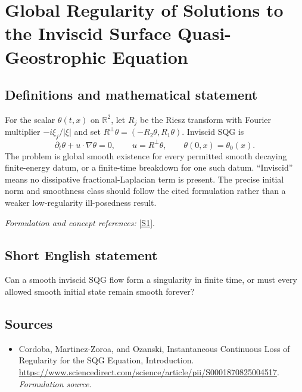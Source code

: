 \documentclass[11pt]{article}
\begin{document}
\section*{\texorpdfstring{Global Regularity of Solutions to the Inviscid Surface Quasi-Geostrophic Equation}{Global Regularity of Solutions to the Inviscid Surface Quasi-Geostrophic Equation}}\label{statement}
\subsection{Definitions and mathematical statement}
For the scalar $\theta(t,x)$ on ${\mathbb{R}}^2$, let $R_j$ be the Riesz transform with Fourier multiplier $-i\xi_j/|\xi|$ and set $R^\perp\theta=(-R_2\theta,R_1\theta)$. Inviscid SQG is
\[
 \partial_t\theta+u\cdot\nabla\theta=0,\qquad u=R^\perp\theta,
 \qquad\theta(0,x)=\theta_0(x).
\]
The problem is global smooth existence for every permitted smooth decaying finite-energy datum, or a finite-time breakdown for one such datum. ``Inviscid'' means no dissipative fractional-Laplacian term is present. The precise initial norm and smoothness class should follow the cited formulation rather than a weaker low-regularity ill-posedness result.
\par\smallskip\textit{Formulation and concept references:} \href{https://www.sciencedirect.com/science/article/pii/S0001870825004517}{[S1]}.

\subsection{Short English statement}
Can a smooth inviscid SQG flow form a singularity in finite time, or must every allowed smooth initial state remain smooth forever?
\subsection{Sources}
\begin{itemize}
\item[S1]Cordoba, Martinez-Zoroa, and Ozanski, Instantaneous Continuous Loss of Regularity for the SQG Equation, Introduction.
\url{https://www.sciencedirect.com/science/article/pii/S0001870825004517}.
\textit{Formulation source.}
\end{itemize}
\end{document}
